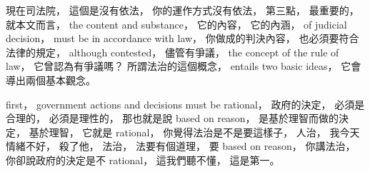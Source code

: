 \hypertarget{w02:cue:1377}{}現在司法院，
\hypertarget{w02:cue:1378}{}這個是沒有依法，
\hypertarget{w02:cue:1379}{}你的運作方式沒有依法，
\hypertarget{w02:cue:1380}{}第三點，
\hypertarget{w02:cue:1381}{}最重要的，
\hypertarget{w02:cue:1382}{}就本文而言，
\hypertarget{w02:cue:1383}{}the content and substance，
\hypertarget{w02:cue:1384}{}它的內容，
\hypertarget{w02:cue:1385}{}它的內涵，
\hypertarget{w02:cue:1386}{}of judicial decision，
\hypertarget{w02:cue:1387}{}must be in accordance with law，
\hypertarget{w02:cue:1388}{}你做成的判決內容，
\hypertarget{w02:cue:1389}{}也必須要符合法律的規定，
\hypertarget{w02:cue:1390}{}although contested，
\hypertarget{w02:cue:1391}{}儘管有爭議，
\hypertarget{w02:cue:1392}{}the concept of the rule of law，
\hypertarget{w02:cue:1393}{}它曾認為有爭議嗎？
\hypertarget{w02:cue:1394}{}所謂法治的這個概念，
\hypertarget{w02:cue:1395}{}entails two basic ideas，
\hypertarget{w02:cue:1396}{}它會導出兩個基本觀念。

\hypertarget{w02:cue:1397}{}first，
\hypertarget{w02:cue:1398}{}government actions and decisions must be rational，
\hypertarget{w02:cue:1399}{}政府的決定，
\hypertarget{w02:cue:1400}{}必須是合理的，
\hypertarget{w02:cue:1401}{}必須是理性的，
\hypertarget{w02:cue:1402}{}那也就是說 based on reason，
\hypertarget{w02:cue:1403}{}是基於理智而做的決定，
\hypertarget{w02:cue:1404}{}基於理智，
\hypertarget{w02:cue:1405}{}它就是 rational，
\hypertarget{w02:cue:1406}{}你覺得法治是不是要這樣子，
\hypertarget{w02:cue:1407}{}人治，
\hypertarget{w02:cue:1408}{}我今天情緒不好，
\hypertarget{w02:cue:1409}{}殺了他，
\hypertarget{w02:cue:1410}{}法治，
\hypertarget{w02:cue:1411}{}法要有個道理，
\hypertarget{w02:cue:1412}{}要 based on reason，
\hypertarget{w02:cue:1413}{}你講法治，
\hypertarget{w02:cue:1414}{}你卻說政府的決定是不 rational，
\hypertarget{w02:cue:1415}{}這我們聽不懂，
\hypertarget{w02:cue:1416}{}這是第一。

